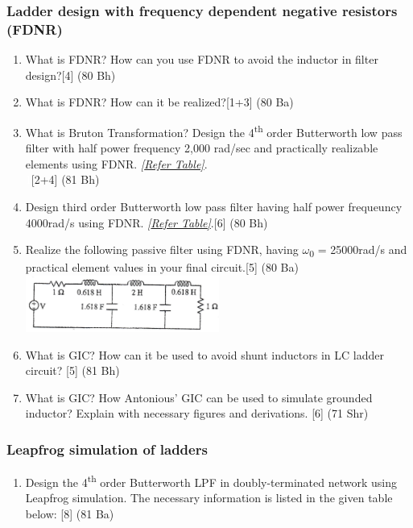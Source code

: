 \documentclass[12pt]{article}
\newcommand{\w}{\(\omega\)}
\newcommand{\enter}{\\\textcolor{white}{1}}
\newcommand{\sub}[1]{\textsubscript{#1}}
\begin{document}
\subsubsection{Ladder design with frequency dependent negative resistors (FDNR)}
\begin{enumerate}
\item What is FDNR? How can you use FDNR to avoid the inductor in filter design?\hfill[4] (80 Bh)
\item What is FDNR? How can it be realized?\hfill [1+3] (80 Ba)
\item What is Bruton Transformation? Design the 4\textsuperscript{th} order Butterworth low pass filter with half power frequency 2,000 rad/sec and practically realizable elements using FDNR. \textit{[\hyperref[sec:tables_81bh]{Refer Table]}}.
\enter\hfill [2+4] (81 Bh)
\item Design third order Butterworth low pass filter having half power frequeuncy 4000rad/s using FDNR. \textit{[\hyperref[sec:tables_81bh]{Refer Table]}}.\hfill [6] (80 Bh)
\item Realize the following passive filter using FDNR, having \w\sub{0} = 25000rad/s and practical element values in your final circuit.\hfill[5] (80 Ba)\\
\includegraphics[width=0.5\textwidth]{fd_4}



			\item What is GIC? How can it be used to avoid shunt inductors in LC ladder circuit? \hfill [5] (81 Bh)

			\item What is GIC? How Antonious' GIC can be used to simulate grounded inductor? Explain with necessary figures and derivations. \hfill [6] (71 Shr)
\end{enumerate}
\subsubsection{Leapfrog simulation of ladders}
\begin{enumerate}
\item Design the 4\textsuperscript{th} order Butterworth LPF in doubly-terminated network using Leapfrog simulation. The necessary information is listed in the given table below:\hspace*{20mm} [8] (81 Ba)\\

\end{enumerate}
\end{document}
